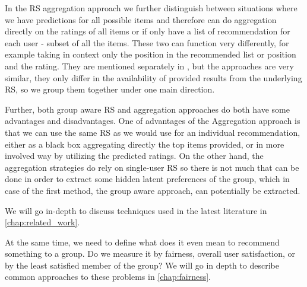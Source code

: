 
In the RS aggregation approach we further distinguish between situations where we have predictions for all possible items and therefore can do aggregation directly on the ratings of all items or if only have a list of recommendation for each user - subset of all the items. These two can function very differently, for example taking in context only the position in the recommended list or position and the rating. They are mentioned separately in \cite{recommendations_to_groups-jameson2007}, but the approaches are very similar, they only differ in the availability of provided results from the underlying RS, so we group them together under one main direction.

Further, both group aware RS and aggregation approaches do both have some advantages and disadvantages. One of advantages of the Aggregation approach is that we can use the same RS as we would use for an individual recommendation, either as a black box aggregating directly the top items provided, or in more involved way by utilizing the predicted ratings. On the other hand, the aggregation strategies do rely on single-user RS so there is not much that can be done in order to extract some hidden latent preferences of the group, which in case of the first method, the group aware approach, can potentially be extracted.


We will go in-depth to discuss techniques used in the latest literature in \ref{chap:related_work}.


At the same time, we need to define what does it even mean to recommend something to a group. Do we measure it by fairness, overall user satisfaction, or by the least satisfied member of the group? We will go in depth to describe common approaches to these problems in \ref{chap:fairness}.

